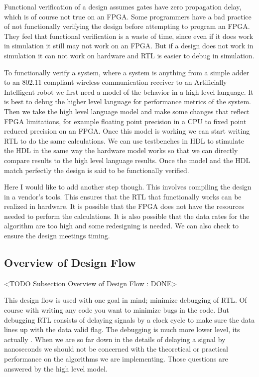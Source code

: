 Functional verification of a design assumes gates have zero propagation delay, which is of course not true on an \ac{FPGA}. Some programmers have a bad practice of not functionally verifying the design before attempting to program an \ac{FPGA}. They feel that functional verification is a waste of time, since even if it does work in simulation it still may not work on an \ac{FPGA}. But if a design does not work in simulation it can not work on hardware and \ac{RTL} is easier to debug in simulation.

To functionally verify a system, where a system is anything from a simple adder to an 802.11 compliant wireless communication receiver to an Artificially Intelligent robot we first need a model of the behavior in a high level language. It is best to debug the higher level language for performance metrics of the system. Then we take the high level language model and make some changes that reflect \ac{FPGA} limitations, for example floating point precision in a \ac{CPU} to fixed point reduced precision on an \ac{FPGA}. Once this model is working we can start writing \ac{RTL} to do the same calculations. We can use testbenches in \ac{HDL} to stimulate the \ac{HDL} in the same way the hardware model works so that we can directly compare results to the high level language results. Once the model and the \ac{HDL} match perfectly the design is said to be functionally verified.

Here I would like to add another step though. This involves compiling the design in a vendor's tools. This ensures that the \ac{RTL} that functionally works can be realized in hardware. It is possible that the \ac{FPGA} does not have the resources needed to perform the calculations. It is also possible that the data rates for the algorithm are too high and some redesigning is needed. We can also check to ensure the design meetings timing.

		

\subsection{Overview of Design Flow}
	<TODO Subsection Overview of Design Flow : DONE>

This design flow is used with one goal in mind; minimize debugging of \ac{RTL}. Of course with writing any code you want to minimize bugs in the code. But debugging \ac{RTL} consists of delaying signals by a clock cycle to make sure the data lines up with the data valid flag. The debugging is much more lower level, its actually . When we are so far down in the details of delaying a signal by nanoseconds we should not be concerned with the theoretical or practical performance on the algorithms we are implementing. Those questions are answered by the high level model.  
	
